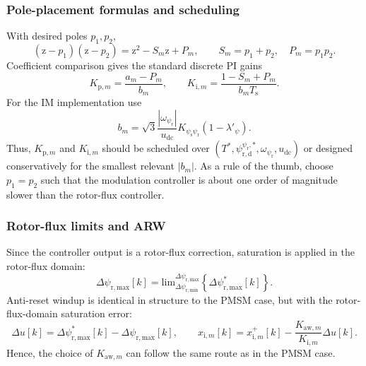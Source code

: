 \begin{frame}
    \frametitle{Pole-placement formulas and scheduling}
    With desired poles $p_1,p_2$,
    \begin{equation}
        (\mathrm{z}-p_1)(\mathrm{z}-p_2)=\mathrm{z}^2-S_m\mathrm{z}+P_m,
        \qquad
        S_m=p_1+p_2,
        \quad P_m=p_1p_2 .
        \label{eq:IM_mod_v06_desired_poly}
    \end{equation}\pause%
    Coefficient comparison gives the standard discrete PI gains
    \begin{equation}
        K_{\mathrm{p},m}=\frac{a_m-P_m}{b_m},
        \qquad
        K_{\mathrm{i},m}=\frac{1-S_m+P_m}{b_mT_{\mathrm{s}}} .
        \label{eq:IM_mod_v06_PI_gains}
    \end{equation}\pause%
    For the IM implementation use
    \begin{equation}
        b_m=\sqrt{3}\frac{|\omega_{\psi_{\mathrm r}}|}{u_{\mathrm{dc}}}
        K_{\psi_{\mathrm{s}}\psi_{\mathrm r}}(1-\lambda'_{\psi}) .
        \label{eq:IM_mod_v06_scheduled_b}
    \end{equation}\pause%
    Thus, $K_{\mathrm{p},m}$ and $K_{\mathrm{i},m}$ should be scheduled over $(T^*,\psi_{\mathrm{r,d}}^{\psi_{\mathrm r},*},\omega_{\psi_{\mathrm r}},u_{\mathrm{dc}})$ or designed conservatively for the smallest relevant $|b_m|$. As a rule of the thumb, choose $p_1=p_2$ such that the modulation controller is about one order of magnitude slower than the rotor-flux controller.
\end{frame}

\begin{frame}
    \frametitle{Rotor-flux limits and ARW}
    Since the controller output is a rotor-flux correction, saturation is applied in the rotor-flux domain:
    \begin{equation}
        \Delta\psi_{\mathrm{r,max}}[k]
        =\mathrm{lim}_{\Delta\psi_{\mathrm{r,min}}}^{\Delta\psi_{\mathrm{r,max}}}
        \left\{\Delta\psi_{\mathrm{r,max}}^{*}[k]\right\} .
        \label{eq:IM_mod_v06_rotor_saturation}
    \end{equation}\pause%
    Anti-reset windup is identical in structure to the PMSM case, but with the rotor-flux-domain saturation error:
    \begin{equation}
        \Delta u[k]=\Delta\psi_{\mathrm{r,max}}^{*}[k]-\Delta\psi_{\mathrm{r,max}}[k],
        \qquad
        x_{\mathrm{i},m}[k]=x_{\mathrm{i},m}^{+}[k]-\frac{K_{\mathrm{aw},m}}{K_{\mathrm{i},m}}\Delta u[k] .
        \label{eq:IM_mod_v06_ARW}
    \end{equation}\pause%
    Hence, the choice of $K_{\mathrm{aw},m}$ can follow the same route as in the PMSM case.
\end{frame}

